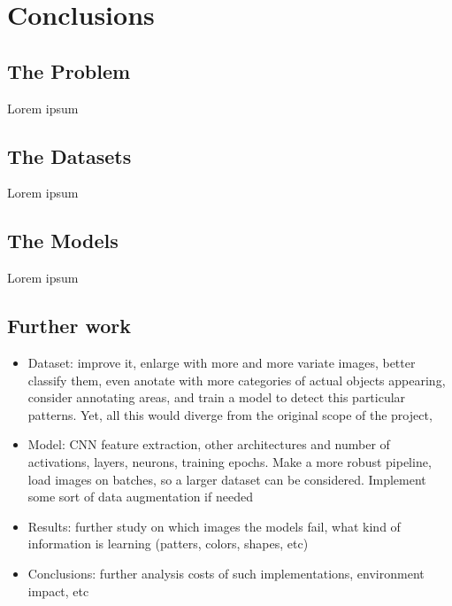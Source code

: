 
\chapter{Conclusions}

\label{Chapter6}


\section{The Problem}

Lorem ipsum

\section{The Datasets}

Lorem ipsum

\section{The Models}

Lorem ipsum

\section{Further work}

\begin{itemize}
	\item Dataset: improve it, enlarge with more and more variate images, better classify them, even anotate with more categories of actual objects appearing, consider annotating areas, and train a model to detect this particular patterns. Yet, all this would diverge from the original scope of the project,
	\item Model: CNN feature extraction, other architectures and number of activations, layers, neurons, training epochs. Make a more robust pipeline, load images on batches, so a larger dataset can be considered. Implement some sort of data augmentation if needed
	\item Results: further study on which images the models fail, what kind of information is learning (patters, colors, shapes, etc)
	\item Conclusions: further analysis costs of such implementations, environment impact, etc
\end{itemize}